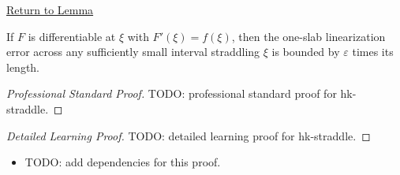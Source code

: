 \newpage
{}
\label{prf:hk-straddle}
\begin{remark*}[Return]\hyperref[lem:hk-straddle]{Return to Lemma}\end{remark*}

\begin{lemma*}
If \(F\) is differentiable at \(\xi\) with \(F'(\xi)=f(\xi)\), then the
one-slab linearization error across any sufficiently small interval straddling
\(\xi\) is bounded by \(\varepsilon\) times its length.
\end{lemma*}

\begin{proof}[Professional Standard Proof]
\LRAProofBodyStart
TODO: professional standard proof for hk-straddle.
\end{proof}

\begin{proof}[Detailed Learning Proof]
\LRAProofBodyStart
TODO: detailed learning proof for hk-straddle.
\end{proof}

\begin{remark*}
\end{remark*}

\begin{dependencies}
\begin{itemize}
  \item TODO: add dependencies for this proof.
\end{itemize}
\end{dependencies}

\clearpage
